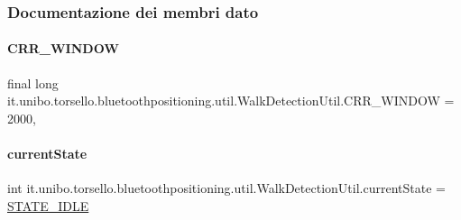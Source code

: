 \subsubsection{Documentazione dei membri dato}
\hypertarget{classit_1_1unibo_1_1torsello_1_1bluetoothpositioning_1_1util_1_1WalkDetectionUtil_a427e521f51f1182c9e8492b5c9e00dd1_a427e521f51f1182c9e8492b5c9e00dd1}{}\label{classit_1_1unibo_1_1torsello_1_1bluetoothpositioning_1_1util_1_1WalkDetectionUtil_a427e521f51f1182c9e8492b5c9e00dd1_a427e521f51f1182c9e8492b5c9e00dd1} 
\paragraph{\texorpdfstring{C\+R\+R\+\_\+\+W\+I\+N\+D\+OW}{CRR\_WINDOW}}
{\footnotesize\ttfamily final long it.\+unibo.\+torsello.\+bluetoothpositioning.\+util.\+Walk\+Detection\+Util.\+C\+R\+R\+\_\+\+W\+I\+N\+D\+OW = 2000\hspace{0.3cm}{\ttfamily [static]}, {\ttfamily [private]}}

\hypertarget{classit_1_1unibo_1_1torsello_1_1bluetoothpositioning_1_1util_1_1WalkDetectionUtil_a6d087343f7fa10a9fb4f72bd81b4cde4_a6d087343f7fa10a9fb4f72bd81b4cde4}{}\label{classit_1_1unibo_1_1torsello_1_1bluetoothpositioning_1_1util_1_1WalkDetectionUtil_a6d087343f7fa10a9fb4f72bd81b4cde4_a6d087343f7fa10a9fb4f72bd81b4cde4} 
\paragraph{\texorpdfstring{current\+State}{currentState}}
{\footnotesize\ttfamily int it.\+unibo.\+torsello.\+bluetoothpositioning.\+util.\+Walk\+Detection\+Util.\+current\+State = \hyperlink{classit_1_1unibo_1_1torsello_1_1bluetoothpositioning_1_1util_1_1WalkDetectionUtil_a37359c8b8bf98a1283c3c06f0b98264f_a37359c8b8bf98a1283c3c06f0b98264f}{S\+T\+A\+T\+E\+\_\+\+I\+D\+LE}\hspace{0.3cm}{\ttfamily [private]}}

